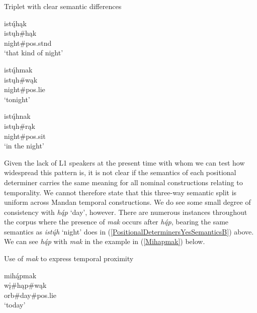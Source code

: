 \begin{exe}
    \item\label{PositionalDeterminersYesSemantics} Triplet with clear semantic differences

    \begin{xlist}
        \item\label{PositionalDeterminersYesSemanticsA} \glll istų́hąk\\
        istųh\#hąk\\
        \textnormal{night}\#pos.stnd\\
        \glt `that kind of night'

        \item\label{PositionalDeterminersYesSemanticsB} \glll istų́hmak\\
        istųh\#wąk\\
        \textnormal{night}\#pos.lie\\
        \glt `tonight'

        \item\label{PositionalDeterminersYesSemanticsC} \glll istų́hnak\\
        istųh\#rąk\\
        \textnormal{night}\#pos.sit\\
        \glt `in the night'
    \end{xlist}
    
    
\end{exe}

Given the lack of L1 speakers at the present time with whom we can test how widespread this pattern is, it is not clear if the semantics of each positional determiner carries the same meaning for all nominal constructions relating to temporality. We cannot therefore state that this three-way semantic split is uniform across Mandan temporal constructions. We do see some small degree of consistency with \textit{hą́p} `day', however. There are numerous instances throughout the corpus where the presence of \textit{mak} occurs after \textit{hą́p}, bearing the same semantics as \textit{istų́h} `night' does in (\ref{PositionalDeterminersYesSemanticsB}) above. We can see \textit{hą́p} with \textit{mak} in the example in (\ref{Mihapmak}) below.

\begin{exe}

\item\label{Mihapmak} Use of \textit{mak} to express temporal proximity

    \glll mihą́pmak\\
    wį\#hąp\#wąk\\ 
    \textnormal{orb}\#\textnormal{day}\#pos.lie\\
    \glt `today'

\end{exe}

